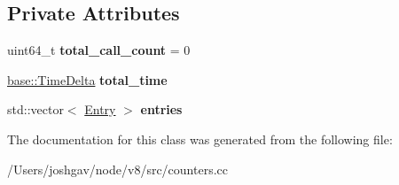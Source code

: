 \subsection*{Private Attributes}
\begin{DoxyCompactItemize}
\item 
uint64\+\_\+t {\bfseries total\+\_\+call\+\_\+count} = 0\hypertarget{classv8_1_1internal_1_1_runtime_call_stat_entries_ad91ba707c910c5200a1b5f885387a0e4}{}\label{classv8_1_1internal_1_1_runtime_call_stat_entries_ad91ba707c910c5200a1b5f885387a0e4}

\item 
\hyperlink{classv8_1_1base_1_1_time_delta}{base\+::\+Time\+Delta} {\bfseries total\+\_\+time}\hypertarget{classv8_1_1internal_1_1_runtime_call_stat_entries_ab69d909cbeb80396cc7de4f249dbfff7}{}\label{classv8_1_1internal_1_1_runtime_call_stat_entries_ab69d909cbeb80396cc7de4f249dbfff7}

\item 
std\+::vector$<$ \hyperlink{classv8_1_1internal_1_1_runtime_call_stat_entries_1_1_entry}{Entry} $>$ {\bfseries entries}\hypertarget{classv8_1_1internal_1_1_runtime_call_stat_entries_a149ab440d33ed89a34548c342e86682e}{}\label{classv8_1_1internal_1_1_runtime_call_stat_entries_a149ab440d33ed89a34548c342e86682e}

\end{DoxyCompactItemize}


The documentation for this class was generated from the following file\+:\begin{DoxyCompactItemize}
\item 
/\+Users/joshgav/node/v8/src/counters.\+cc\end{DoxyCompactItemize}
